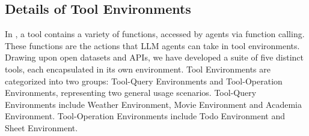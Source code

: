 \subsection{Details of Tool Environments}
In \BenchName,
a tool contains a variety of functions, accessed by agents via function calling.
These functions are the actions that LLM agents can take in tool environments.
Drawing upon open datasets and APIs, we have developed a suite of five distinct tools, each encapsulated in its own environment.
Tool Environments are categorized into two groups: Tool-Query Environments and Tool-Operation Environments, representing two general usage scenarios.
Tool-Query Environments include Weather Environment, Movie Environment and Academia Environment.
Tool-Operation Environments include Todo Environment and Sheet Environment.




